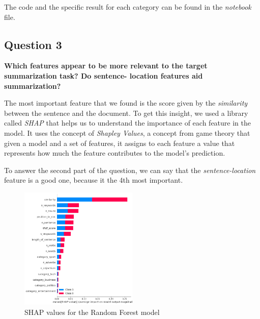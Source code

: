 The code and the specific result for each category can be found in the \textit{notebook} file.


\subsection{Question 3}
\textbf{Which features appear to be more relevant to the target summarization task? Do sentence- location features aid summarization?}

The most important feature that we found is the score given by the \textit{similarity} between the sentence and the document. To get this 
insight, we used a library called \textit{SHAP} that helps us to understand the importance of each feature in the model. It uses the concept of 
\textit{Shapley Values}, a concept from game theory that given a model and a set of features, it assigns to each feature a value that represents
how much the feature contributes to the model's prediction. 

To answer the second part of the question, we can say that the \textit{sentence-location} feature is a good one, because it the 4th most important.

\begin{figure}[H]
  \centering
  \includegraphics[width=0.5\textwidth]{images/shap.png}
  \caption{SHAP values for the Random Forest model}
  \label{fig:shap_values}
\end{figure}

